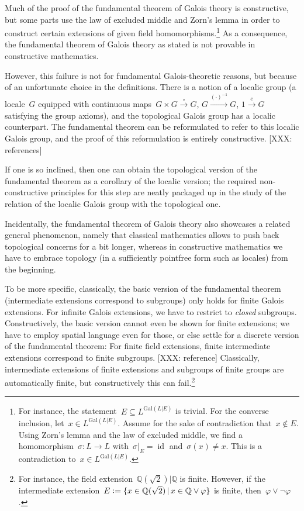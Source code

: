 \documentclass{ws-rv9x6}
\newcommand{\QQ}{\mathbb{Q}}
\newcommand{\defeq}{\vcentcolon=}
\newcommand{\Gal}{\mathrm{Gal}}
\renewcommand{\_}{\mathpunct{.}}
\newcommand{\?}{\,{:}\,}
\begin{document}
Much of the proof of the fundamental theorem of Galois theory is constructive,
but some parts use the law of excluded middle and Zorn's lemma in order to
construct certain extensions of given field homomorphisms.\footnote{For
instance, the statement~$E \subseteq L^{\Gal(L|E)}$ is trivial. For the converse
inclusion, let~$x \in L^{\Gal(L|E)}$. Assume for the sake of contradiction
that~$x \not\in E$. Using Zorn's lemma and the law of excluded middle, we find
a homomorphism~$\sigma : L \to L$ with~$\sigma|_E = \operatorname{id}$
and~$\sigma(x) \neq x$. This is a contradiction to~$x \in L^{\Gal(L|E)}$.}
As a consequence, the fundamental theorem of Galois theory as stated is not
provable in constructive mathematics.

However, this failure is not for fundamental Galois-theoretic reasons, but because of an
unfortunate choice in the definitions. There is a notion of a localic group (a
locale~$G$ equipped with continuous maps~$G \times G \xrightarrow{\circ} G$, $G
\xrightarrow{(\cdot)^{-1}} G$, $1 \xrightarrow{e} G$ satisfying the group
axioms), and the topological Galois group has a localic counterpart. The
fundamental theorem can be reformulated to refer to this localic Galois group,
and the proof of this reformulation is entirely constructive.
[XXX: references]

If one is so inclined, then one can obtain the topological version of the
fundamental theorem as a corollary of the localic version; the required
non-constructive principles for this step are neatly packaged up in the study
of the relation of the localic Galois group with the topological one.

\begin{remark}Incidentally, the fundamental theorem of Galois theory also
showcases a related general phenomenon, namely that classical mathematics
allows to push back topological concerns for a bit longer,
whereas in constructive mathematics we have to embrace topology
(in a sufficiently pointfree form such as locales) from the beginning.

To be more specific, classically, the basic version of the fundamental theorem
(intermediate extensions correspond to subgroups) only holds for finite Galois
extensions. For infinite Galois extensions, we have to restrict to
\emph{closed} subgroups. Constructively, the basic version cannot even be shown
for finite extensions; we have to employ spatial language even for those, or
else settle for a discrete version of the fundamental theorem: For finite field
extensions, finite intermediate extensions correspond to finite subgroups.
[XXX: reference]
Classically, intermediate extensions of finite extensions and subgroups of
finite groups are automatically finite, but constructively this can
fail.\footnote{For instance, the field extension~$\QQ(\sqrt{2})|\QQ$ is finite.
However, if the intermediate extension~$E \defeq \{ x \in \QQ(\sqrt{2}) \,|\, x
\in \QQ \vee \varphi \}$ is finite, then~$\varphi \vee \neg\varphi$.}
\end{remark}
\end{document}
